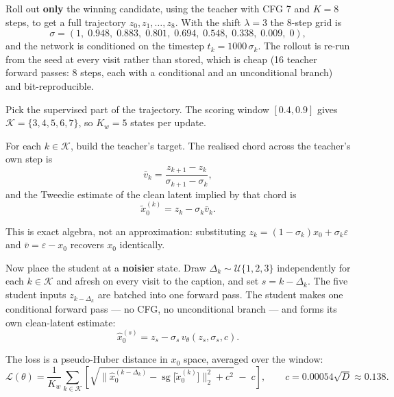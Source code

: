 \documentclass[11pt,a4paper]{article}
\DeclareMathOperator{\sg}{sg}
\begin{document}
Roll out \textbf{only} the winning candidate, using the teacher with CFG 7 and $K = 8$ steps, to get a full trajectory $z_0, z_1, \ldots, z_8$. With the shift $\lambda = 3$ the 8-step grid is
\begin{equation}
\sigma = (1,\; 0.948,\; 0.883,\; 0.801,\; 0.694,\; 0.548,\; 0.338,\; 0.009,\; 0),
\end{equation}
and the network is conditioned on the timestep $t_k = 1000\,\sigma_k$. The rollout is re-run from the seed at every visit rather than stored, which is cheap (16 teacher forward passes: 8 steps, each with a conditional and an unconditional branch) and bit-reproducible.

Pick the supervised part of the trajectory. The scoring window $[0.4, 0.9]$ gives $\mathcal{K} = \{3,4,5,6,7\}$, so $K_w = 5$ states per update.

For each $k \in \mathcal{K}$, build the teacher's target. The realised chord across the teacher's own step is
\begin{equation}
\bar{v}_k = \frac{z_{k+1} - z_k}{\sigma_{k+1} - \sigma_k},
\end{equation}
and the Tweedie estimate of the clean latent implied by that chord is
\begin{equation}
\tilde{x}_0^{(k)} = z_k - \sigma_k \bar{v}_k.
\end{equation}

This is exact algebra, not an approximation: substituting $z_k = (1-\sigma_k)x_0 + \sigma_k\varepsilon$ and $\bar v = \varepsilon - x_0$ recovers $x_0$ identically.

Now place the student at a \textbf{noisier} state. Draw $\Delta_k \sim \mathcal{U}\{1,2,3\}$ independently for each $k \in \mathcal{K}$ and afresh on every visit to the caption, and set $s = k - \Delta_k$. The five student inputs $z_{k-\Delta_k}$ are batched into one forward pass. The student makes one conditional forward pass --- no CFG, no unconditional branch --- and forms its own clean-latent estimate:
\begin{equation}
\hat{x}_0^{(s)} = z_s - \sigma_s\, v_\theta(z_s, \sigma_s, c).
\end{equation}

The loss is a pseudo-Huber distance in $x_0$ space, averaged over the window:
\begin{equation}
\mathcal{L}(\theta) = \frac{1}{K_w}\sum_{k \in \mathcal{K}} \left[ \sqrt{\big\lVert \hat{x}_0^{(k-\Delta_k)} - \sg\big[\tilde{x}_0^{(k)}\big] \big\rVert_2^2 + c^2} \;-\; c \right], \qquad c = 0.00054\sqrt{D} \approx 0.138.
\end{equation}
\end{document}
